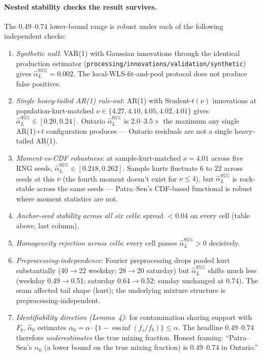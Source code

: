 \documentclass[11pt]{article}
\begin{document}
\paragraph{Nested stability checks the result survives.} The
\(0.49\)--\(0.74\) lower-bound range is robust under each of the
following independent checks:
\begin{enumerate}[leftmargin=2em]
  \item \emph{Synthetic null}: VAR(1) with Gaussian innovations
  through the identical production estimator
  (\texttt{processing/innovations/validation/synthetic}) gives
  \(\hat\alpha_L^{95\%} = 0.002\). The local-WLS-fit-and-pool
  protocol does not produce false positives.
  \item \emph{Single heavy-tailed AR(1) rule-out}: AR(1) with
  Student-\(t(\nu)\) innovations at population-kurt-matched
  \(\nu \in \{4.27, 4.10, 4.05, 4.02, 4.01\}\) gives
  \(\hat\alpha_L^{95\%} \in [0.20, 0.24]\). Ontario
  \(\hat\alpha_L^{95\%}\) is \(2.0\)--\(3.5\times\) the maximum any
  single AR(1)+\(t\) configuration produces --- Ontario residuals
  are not a single heavy-tailed AR(1).
  \item \emph{Moment-vs-CDF robustness}: at sample-kurt-matched
  \(\nu = 4.01\) across five RNG seeds,
  \(\hat\alpha_L^{95\%} \in [0.218, 0.262]\). Sample kurts fluctuate
  \(6\) to \(22\) across seeds at this \(\nu\) (the fourth moment
  doesn't exist for \(\nu \le 4\)), but \(\hat\alpha_L^{95\%}\) is
  rock-stable across the same seeds --- Patra--Sen's CDF-based
  functional is robust where moment statistics are not.
  \item \emph{Anchor-seed stability across all six cells}: spread
  \(< 0.04\) on every cell (table above, last column).
  \item \emph{Homogeneity rejection across cells}: every cell
  passes \(\hat\alpha_L^{95\%} > 0\) decisively.
  \item \emph{Preprocessing-independence}: Fourier preprocessing
  drops pooled kurt substantially (40\(\to\)22 weekday;
  28\(\to\)20 saturday) but \(\hat\alpha_L^{95\%}\) shifts much less
  (weekday 0.49\(\to\)0.51; saturday 0.64\(\to\)0.52; sunday
  unchanged at 0.74). The seam affected tail shape (kurt); the
  underlying mixture structure is preprocessing-independent.
  \item \emph{Identifiability direction (Lemma~4)}: for contamination
  sharing support with \(F_b\), \(\hat\alpha_0\) estimates
  \(\alpha_0 = \alpha \cdot \{1 - \operatorname{ess\,inf}(f_s/f_b)\}
  \leq \alpha\). The headline \(0.49\)--\(0.74\) therefore
  \emph{underestimates} the true mixing fraction. Honest framing:
  ``Patra--Sen's \(\alpha_0\) (a lower bound on the true mixing
  fraction) is \(0.49\)--\(0.74\) in Ontario.''
\end{enumerate}
\end{document}
